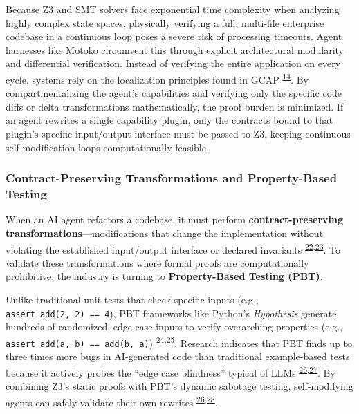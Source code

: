 \documentclass[
  11pt,
]{article}
\begin{document}
Because Z3 and SMT solvers face exponential time complexity when
analyzing highly complex state spaces, physically verifying a full,
multi-file enterprise codebase in a continuous loop poses a severe risk
of processing timeouts. Agent harnesses like Motoko circumvent this
through explicit architectural modularity and differential verification.
Instead of verifying the entire application on every cycle, systems rely
on the localization principles found in GCAP
\textsuperscript{\protect\hyperlink{cite-14}{14}}. By compartmentalizing
the agent's capabilities and verifying only the specific code diffs or
delta transformations mathematically, the proof burden is minimized. If
an agent rewrites a single capability plugin, only the contracts bound
to that plugin's specific input/output interface must be passed to Z3,
keeping continuous self-modification loops computationally feasible.

\hypertarget{contract-preserving-transformations-and-property-based-testing}{%
\subsubsection{Contract-Preserving Transformations and Property-Based
Testing}\label{contract-preserving-transformations-and-property-based-testing}}

When an AI agent refactors a codebase, it must perform
\textbf{contract-preserving transformations}---modifications that change
the implementation without violating the established input/output
interface or declared invariants
\textsuperscript{\protect\hyperlink{cite-22}{22},\protect\hyperlink{cite-23}{23}}.
To validate these transformations where formal proofs are
computationally prohibitive, the industry is turning to
\textbf{Property-Based Testing (PBT)}.

Unlike traditional unit tests that check specific inputs (e.g.,
\texttt{assert\ add(2,\ 2)\ ==\ 4}), PBT frameworks like Python's
\emph{Hypothesis} generate hundreds of randomized, edge-case inputs to
verify overarching properties (e.g.,
\texttt{assert\ add(a,\ b)\ ==\ add(b,\ a)})
\textsuperscript{\protect\hyperlink{cite-24}{24},\protect\hyperlink{cite-25}{25}}.
Research indicates that PBT finds up to three times more bugs in
AI-generated code than traditional example-based tests because it
actively probes the ``edge case blindness'' typical of LLMs
\textsuperscript{\protect\hyperlink{cite-26}{26},\protect\hyperlink{cite-27}{27}}.
By combining Z3's static proofs with PBT's dynamic sabotage testing,
self-modifying agents can safely validate their own rewrites
\textsuperscript{\protect\hyperlink{cite-26}{26},\protect\hyperlink{cite-28}{28}}.
\end{document}
